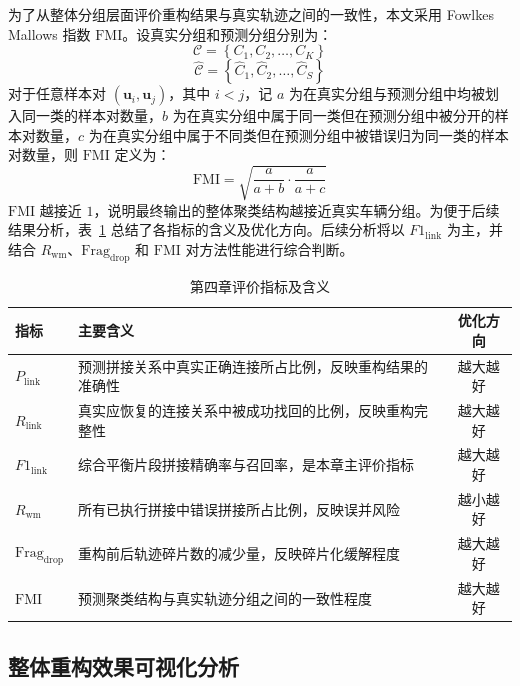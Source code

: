 \documentclass{xdupgthesis}
\begin{document}
为了从整体分组层面评价重构结果与真实轨迹之间的一致性，本文采用 Fowlkes Mallows 指数 $\mathrm{FMI}$。设真实分组和预测分组分别为：
\begin{equation}
	\mathcal{C}
	=
	\left\{C_1,C_2,\ldots,C_K\right\}
\end{equation}
\begin{equation}
	\hat{\mathcal{C}}
	=
	\left\{\hat{C}_1,\hat{C}_2,\ldots,\hat{C}_S\right\}
\end{equation}
对于任意样本对 $\left(\mathbf{u}_i,\mathbf{u}_j\right)$，其中 $i<j$，记 $a$ 为在真实分组与预测分组中均被划入同一类的样本对数量，$b$ 为在真实分组中属于同一类但在预测分组中被分开的样本对数量，$c$ 为在真实分组中属于不同类但在预测分组中被错误归为同一类的样本对数量，则 $\mathrm{FMI}$ 定义为：
\begin{equation}
	\mathrm{FMI}
	=
	\sqrt{
		\frac{a}{a+b}
		\cdot
		\frac{a}{a+c}
	}
\end{equation}
$\mathrm{FMI}$ 越接近 $1$，说明最终输出的整体聚类结构越接近真实车辆分组。为便于后续结果分析，表~\ref{tab:ch4_metric_summary} 总结了各指标的含义及优化方向。后续分析将以 $F1_{\mathrm{link}}$ 为主，并结合 $R_{\mathrm{wm}}$、$\mathrm{Frag}_{\mathrm{drop}}$ 和 $\mathrm{FMI}$ 对方法性能进行综合判断。

\begin{table}[htbp]
	\centering
	\caption{第四章评价指标及含义}
	\label{tab:ch4_metric_summary}
	\renewcommand{\arraystretch}{1.2}
	\begin{tabular}{p{}p{}c}
		\toprule
		指标 & 主要含义 & 优化方向 \\
		\midrule
		$P_{\mathrm{link}}$ & 预测拼接关系中真实正确连接所占比例，反映重构结果的准确性 & 越大越好 \\
		$R_{\mathrm{link}}$ & 真实应恢复的连接关系中被成功找回的比例，反映重构完整性 & 越大越好 \\
		$F1_{\mathrm{link}}$ & 综合平衡片段拼接精确率与召回率，是本章主评价指标 & 越大越好 \\
		$R_{\mathrm{wm}}$ & 所有已执行拼接中错误拼接所占比例，反映误并风险 & 越小越好 \\
		$\mathrm{Frag}_{\mathrm{drop}}$ & 重构前后轨迹碎片数的减少量，反映碎片化缓解程度 & 越大越好 \\
		$\mathrm{FMI}$ & 预测聚类结构与真实轨迹分组之间的一致性程度 & 越大越好 \\
		\bottomrule
	\end{tabular}
\end{table}

\subsection{整体重构效果可视化分析}
\end{document}
